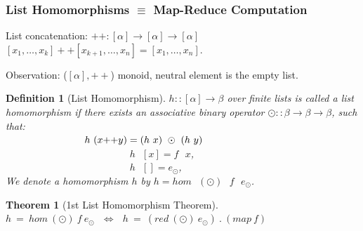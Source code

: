 \documentclass{beamer}
\newcommand{\emp}[1]{\textcolor{DikuRed}{ #1}}
\newtheorem{mydef}{Definition}
\newtheorem{mytheo}{Theorem}
\begin{document}
\begin{frame}
  \frametitle{List Homomorphisms $\equiv$ Map-Reduce Computation} 

\emp{List concatenation:} $++ : [\alpha] \rightarrow [\alpha] \rightarrow [\alpha]$\\
$[x_1, \ldots, x_k] ++ [x_{k+1}, \ldots, x_n] = [x_1, \ldots, x_n]$.

\smallskip

Observation: \emp{($[\alpha], ++$) monoid}, neutral element is the empty list.

\bigskip

\begin{mydef}[List Homomorphism]\label{ListHomDef}\vspace{-1ex}
$h :: [\alpha] \rightarrow \beta$ over finite lists is called a 
{\em list homomorphism} if there exists an associative binary operator 
$\odot :: \beta \rightarrow \beta \rightarrow \beta$, such that: \\
$\mbox{~~~~~~~~~~~~~~~~~~~~~~~}$
\emp{$h \mbox{ } (x{\tt ++}y) = (h\mbox{ }x)\mbox{ }\odot\mbox{ }(h\mbox{ }y)$} \\
\mbox{~~~~~~~~~~~~~~~~~~~~~~~~}\emp{$h\mbox{ }[x] = f\mbox{ }x$},\\
\mbox{~~~~~~~~~~~~~~~~~~~~~~~~}\emp{$h\mbox{ }[ ] = e_{\odot}$},\\
We denote a homomorphism $h$ by \emp{$h = hom \mbox{ }(\odot) \mbox{ }f\mbox{ }e_{\odot}$}.
\end{mydef}

\begin{mytheo}[1st List Homomorphism Theorem]\label{LHomLema}
\emp{$h~=~hom~(\odot)~f~e_{\odot}~~~\Leftrightarrow~~~h~=~(red~(\odot)~e_{\odot})~.~(map~f)$}
\end{mytheo}

\end{frame}
\end{document}

